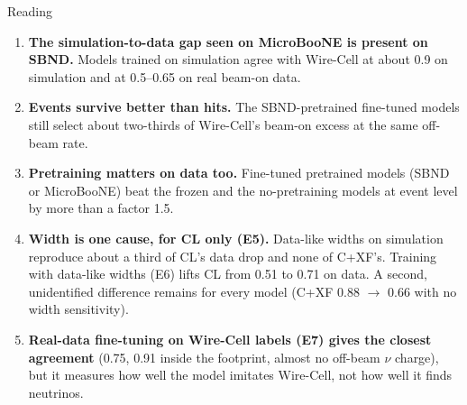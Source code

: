\documentclass[aspectratio=169,10pt]{beamer}
\begin{document}
\begin{frame}{Reading}
  \footnotesize
  \begin{enumerate}\setlength{\itemsep}{6pt}
    \item \textbf{The simulation-to-data gap seen on MicroBooNE is present on SBND.} Models trained on simulation agree with Wire-Cell at
      about 0.9 on simulation and at 0.5--0.65 on real beam-on data.
    \item \textbf{Events survive better than hits.} The SBND-pretrained fine-tuned models still select about two-thirds of Wire-Cell's
      beam-on excess at the same off-beam rate.
    \item \textbf{Pretraining matters on data too.} Fine-tuned pretrained models (SBND or MicroBooNE) beat the frozen and the
      no-pretraining models at event level by more than a factor 1.5.
    \item \textbf{Width is one cause, for CL only (E5).} Data-like widths on simulation reproduce about a third of CL's data drop and none
      of C+XF's. Training with data-like widths (E6) lifts CL from 0.51 to 0.71 on data. A second, unidentified difference remains
      for every model (C+XF 0.88 $\to$ 0.66 with no width sensitivity).
    \item \textbf{Real-data fine-tuning on Wire-Cell labels (E7) gives the closest agreement} (0.75, 0.91 inside the footprint, almost
      no off-beam $\nu$ charge), but it measures how well the model imitates Wire-Cell, not how well it finds neutrinos.
  \end{enumerate}
\end{frame}
\end{document}
